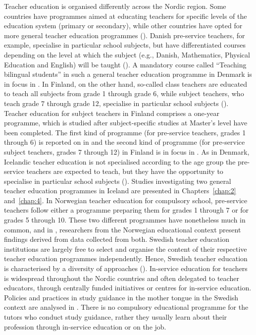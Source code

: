 \documentclass[output=paper]{langscibook}
\begin{document}
Teacher education is organised differently across the Nordic region. Some countries have programmes aimed at educating teachers for specific levels of the education system (primary or secondary), while other countries have opted for more general teacher education programmes (\citealt{Elstad2020}). Danish pre-service teachers, for example, specialise in particular school subjects, but have differentiated courses depending on the level at which the subject (e.g., Danish, Mathematics, Physical Education and English) will be taught (\citealt{MadsenJensen2020}). A mandatory course called “Teaching bilingual students” in such a general teacher education programme in Denmark is in focus in . In Finland, on the other hand, so-called class teachers are educated to teach all subjects from grade 1 through grade 6, while subject teachers, who teach grade 7 through grade 12, specialise in particular school subjects (\citealt{Hansen2020}). Teacher education for subject teachers in Finland comprises a one-year programme, which is studied after subject-specific studies at Master's level have been completed. The first kind of programme (for pre-service teachers, grades 1 through 6) is reported on in  and the second kind of programme (for pre-service subject teachers, grades 7 through 12) in Finland is in focus in . As in Denmark, Icelandic teacher education is not specialised according to the age group the pre-service teachers are expected to teach, but they have the opportunity to specialise in particular school subjects (\citealt{Sigursson2020}). Studies investigating two general teacher education programmes in Iceland are presented in Chapters~\ref{chap:2} and~\ref{chap:4}. In Norwegian teacher education for compulsory school, pre-service teachers follow either a programme preparing them for grades 1 through 7 or for grades 5 through 10. These two different programmes have nonetheless much in common, and in , researchers from the Norwegian educational context present findings derived from data collected from both. Swedish teacher education institutions are largely free to select and organise the content of their respective teacher education programmes independently. Hence, Swedish teacher education is characterised by a diversity of approaches (\citealt{Astrand2020}). In-service education for teachers is widespread throughout the Nordic countries and often delegated to teacher educators, through centrally funded initiatives or centres for in-service education. Policies and practices in study guidance in the mother tongue in the Swedish context are analysed in . There is no compulsory educational programme for the tutors who conduct study guidance, rather they usually learn about their profession through in-service education or on the job.
\end{document}
